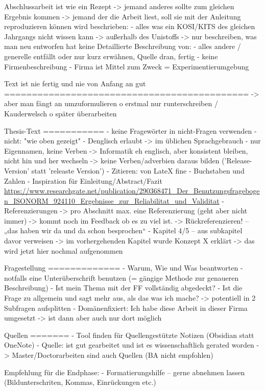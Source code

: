 Abschlussarbeit ist wie ein Rezept
-> jemand anderes sollte zum gleichen Ergebnis kommen
-> jemand der die Arbeit liest, soll sie mit der Anleitung reproduzieren können
wird beschrieben:
- alles was ein KOSI/KITS des gleichen Jahrgangs nicht wissen kann
  -> außerhalb des Unistoffs
  -> nur beschreiben, was man neu entworfen hat
keine Detaillierte Beschreibung von:
- alles andere / generelle entfällt oder nur kurz erwähnen, Quelle dran, fertig
- keine Firmenbeschreibung - Firma ist Mittel zum Zweck = Experimentierumgebung

Text ist nie fertig und nie von Anfang an gut
============================================
-> aber man fängt an umzuformulieren
o	erstmal nur runterschreiben / Kauderwelsch
o	später überarbeiten

Thesis-Text
===========
- keine Fragewörter in nicht-Fragen verwenden - nicht: "wie oben gezeigt"
- Denglisch erlaubt
  -> im üblichen Sprachgebrauch - nur Eigennamen, keine Verben
  -> Informatik eh englisch, aber konsistent bleiben, nicht hin und her wechseln
  -> keine Verben/adverbien daraus bilden ('Release-Version' statt 'releaste Version')
- Zitieren: von LateX fine - Buchstaben und Zahlen
- Inspiration für Einleitung/Abstract/Fazit \url{https://www.researchgate.net/publication/290368471_Der_Benutzungsfragebogen_ISONORM_924110_Ergebnisse_zur_Reliabilitat_und_Validitat}
-	Referenzierungen
    -> pro Abschnitt max. eine Referenzierung (geht aber nicht immer)
    -> kommt noch im Feedback ob es zu viel ist.
    -> Rückreferenzieren! – „das haben wir da und da schon besprochen“
    - Kapitel 4/5 – aus subkapitel davor verweisen
        -> im vorhergehenden Kapitel wurde Konzept X erklärt
        -> das wird jetzt hier nochmal aufgenommen


Fragestellung
=============
- Warum, Wie und Was beantworten
- notfalls eine Unterüberschrift benutzen (= gängige Methode zur genaueren Beschreibung)
- Ist mein Thema mit der FF vollständig abgedeckt?
- Ist die Frage zu allgemein und sagt mehr aus, als das was ich mache?
  -> potentiell in 2 Subfragen aufsplitten
- Domänenfixiert: Ich habe diese Arbeit in dieser Firma umgesetzt
  -> ist dann aber auch nur dort möglich

Quellen
=======
- Tool finden für Quellengestützte Notizen (Obsidian statt OneNote)
- Quelle: ist gut gearbeitet und ist es wissenschaftlich gerated worden
  -> Master/Doctorarbeiten sind auch Quellen (BA nicht empfohlen)

Empfehlung für die Endphase:
-	Formatierungshilfe – gerne abnehmen lassen (Bildunterschriten, Kommas, Einrückungen etc.)
